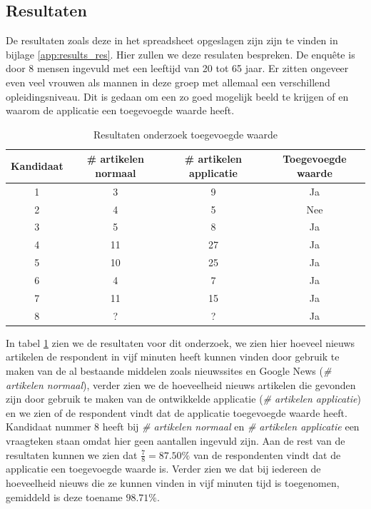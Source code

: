 \documentclass[twoside,openright]{uva-bachelor-thesis}
\begin{document}
		\subsection{Resultaten}
			De resultaten zoals deze in het spreadsheet opgeslagen zijn zijn te vinden in bijlage \ref{app:results_res}. Hier zullen we deze resulaten bespreken. De enqu\^ete is door 8 mensen ingevuld met een leeftijd van 20 tot 65 jaar. Er zitten ongeveer even veel vrouwen als mannen in deze groep met allemaal een verschillend opleidingsniveau. Dit is gedaan om een zo goed mogelijk beeld te krijgen of en waarom de applicatie een toegevoegde waarde heeft.
			\begin{table}
				\centering
				\begin{tabular}{| c | c | c | c |}
					\hline
					\textbf{Kandidaat} & \textbf{\# artikelen normaal} & \textbf{\# artikelen applicatie} & \textbf{Toegevoegde waarde} \\
					\hline
					1 & 3 & 9 & Ja \\ \hline
					2 & 4 & 5 & Nee \\ \hline
					3 & 5 & 8 & Ja \\ \hline
					4 & 11 & 27 & Ja \\ \hline
					5 & 10 & 25 & Ja \\ \hline
					6 & 4 & 7 & Ja \\ \hline
					7 & 11 & 15 & Ja \\ \hline
					8 & ? & ? & Ja \\ \hline
				\end{tabular}
				\caption{Resultaten onderzoek toegevoegde waarde}
				\label{tab:res}
			\end{table}
			In tabel \ref{tab:res} zien we de resultaten voor dit onderzoek, we zien hier hoeveel nieuws artikelen de respondent in vijf minuten heeft kunnen vinden door gebruik te maken van de al bestaande middelen zoals nieuwssites en Google News (\textit{\# artikelen normaal}), verder zien we de hoeveelheid nieuws artikelen die gevonden zijn door gebruik te maken van de ontwikkelde applicatie (\textit{\# artikelen applicatie}) en we zien of de respondent vindt dat de applicatie toegevoegde waarde heeft. Kandidaat nummer 8 heeft bij \textit{\# artikelen normaal} en \textit{\# artikelen applicatie} een vraagteken staan omdat hier geen aantallen ingevuld zijn. Aan de rest van de resultaten kunnen we zien dat $\frac{7}{8} = 87.50\%$ van de respondenten vindt dat de applicatie een toegevoegde waarde is. Verder zien we dat bij iedereen de hoeveelheid nieuws die ze kunnen vinden in vijf minuten tijd is toegenomen, gemiddeld is deze toename $98.71\%$.
\end{document}
